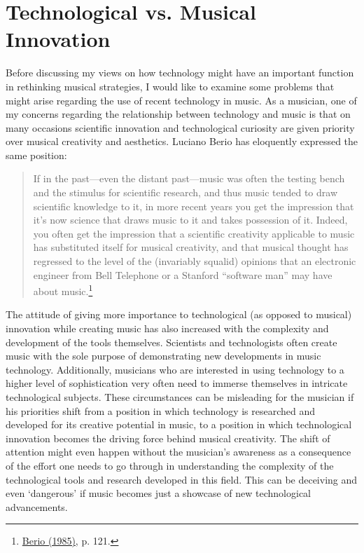 \section{Technological vs. Musical Innovation}

Before discussing my views on how technology might have an important function in rethinking musical strategies, I would like to examine some problems that might arise regarding the use of recent technology in music. As a musician, one of my concerns regarding the relationship between technology and music is that on many occasions scientific innovation and technological curiosity are given priority over musical creativity and aesthetics. Luciano Berio has eloquently expressed the same position:
\begin{quote}
If in the past---even the distant past---music was often the testing bench and the stimulus for scientific research, and thus music tended to draw scientific knowledge to it, in more recent years you get the impression that it's now science that draws music to it and takes possession of it. Indeed, you often get the impression that a scientific creativity applicable to music has substituted itself for musical creativity, and that musical thought has regressed to the level of the (invariably squalid) opinions that an electronic engineer from Bell Telephone or a Stanford ``software man'' may have about music.\footnote{\hyperlink{berio}{Berio (1985)}, p. 121.} 
\end{quote}
The attitude of giving more importance to technological (as opposed to musical) innovation while creating music has also increased with the complexity and development of the tools themselves. Scientists and technologists often create music with the sole purpose of demonstrating new developments in music technology. Additionally, musicians who are interested in using technology to a higher level of sophistication very often need to immerse themselves in intricate technological subjects. These circumstances can be misleading for the musician if his priorities shift from a position in which technology is researched and developed for its creative potential in music, to a position in which technological innovation becomes the driving force behind musical creativity.  The shift of attention might even happen without the musician's awareness as a consequence of the effort one needs to go through in understanding the complexity of the technological tools and research developed in this field. This can be deceiving and even `dangerous' if music becomes just a showcase of new technological advancements. 

